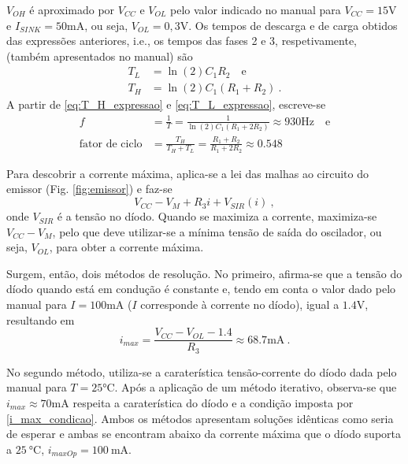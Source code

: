 $V_{OH}$ é aproximado por $V_{CC}$ e $V_{OL}$ pelo valor indicado no manual para $V_{CC} = 15 \si{\volt}$ e $I_{SINK} = 50 \si{\milli \ampere}$, ou seja, $V_{OL} = 0,3 \si{\volt}$. Os tempos de descarga e de carga obtidos das expressões anteriores, i.e., os tempos das fases 2 e 3, respetivamente, (também apresentados no manual) são
\begin{align}
    T_L &= \ln (2) C_1 R_2 \quad \text{e} \label{eq:T_L_expressao} \\
    T_H &= \ln (2) C_1 (R_1 + R_2) \label{eq:T_H_expressao}\:.
\end{align}
A partir de \eqref{eq:T_H_expressao} e \eqref{eq:T_L_expressao}, escreve-se
\begin{align}
    f &= \frac{1}{T} = \frac{1}{\ln(2) C_1 (R_1 + 2 R_2)} \approx 930 \si{\hertz} \quad \text{e}\\
    \text{fator de ciclo} &=\frac{T_H}{T_H + T_L} = \frac{R_1+R_2}{R_1+2 R_2} \approx 0.548 \label{eq:fatordeciclo}
\end{align}

Para descobrir a corrente máxima, aplica-se a lei das malhas ao circuito do emissor (Fig. \ref{fig:emissor}) e faz-se 
\begin{equation}
    V_{CC} - V_M + R_3 i + V_{SIR} (i) \label{i_max_condicao}\:,
\end{equation}
onde $V_{SIR}$ é a tensão no díodo. Quando se maximiza a corrente, maximiza-se $V_{CC} - V_M$, pelo que deve utilizar-se a mínima tensão de saída do oscilador, ou seja, $V_{OL}$, para obter a corrente máxima.

Surgem, então, dois métodos de resolução. No primeiro, afirma-se que a tensão do díodo quando está em condução é constante e, tendo em conta o valor dado pelo manual para $I = 100 \si{\milli \ampere}$ ($I$ corresponde à corrente no díodo), igual a $1.4 \si{\volt}$, resultando em
\begin{equation*}
    i_{max} = \frac{V_{CC} - V_{OL} - 1.4}{R_3} \approx 68.7 \si{\milli \ampere}\:.
\end{equation*}

No segundo método, utiliza-se a caraterística tensão-corrente do díodo dada pelo manual para $T = 25 \si{\celsius}$. Após a aplicação de um método iterativo, observa-se que $i_{max} \approx 70 \si{\milli \ampere}$ respeita a caraterística do díodo e a condição imposta por \eqref{i_max_condicao}. Ambos os métodos apresentam soluções idênticas como seria de esperar e ambas se encontram abaixo da corrente máxima que o díodo suporta a $\SI{25}{\celsius}$, $i_{maxOp}=\SI{100}{\milli\ampere}$.

